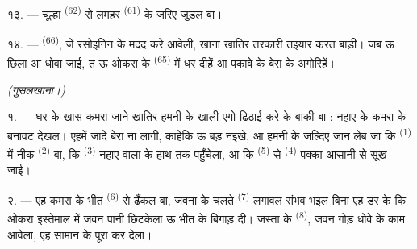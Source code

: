 १३. --- चूल्हा  \textsuperscript{(62)} से लमहर
 \textsuperscript{(61)} के जरिए जुड़ल बा।

१४. ---  \textsuperscript{(66)}, जे रसोइनिन के
मदद करे आवेली, खाना खातिर तरकारी तइयार करत बाड़ी। जब ऊ छिला आ धोवा
जाई, त ऊ ओकरा के  \textsuperscript{(65)} में धर दीहें आ
पकावे के बेरा के अगोरिहें।

\VUsaut{4.0mm}
{\centering\fontsize{10.2pt}{10.2pt}\selectfont{} \textit{(गुसलखाना।)}\par}
\VUsaut{3.0mm}

१. --- घर के खास कमरा जाने खातिर हमनी के खाली एगो ढिठाई करे के बाकी
बा : नहाए के कमरा के बनावट देखल। एहमें जादे बेरा ना लागी, काहेकि ऊ
बड़ नइखे, आ हमनी के जल्दिए जान लेब जा कि 
\textsuperscript{(1)} में नीक 
\textsuperscript{(2)} बा, कि  \textsuperscript{(3)}
नहाए वाला के हाथ तक पहुँचेला, आ कि  \textsuperscript{(5)}
से  \textsuperscript{(4)} पक्का आसानी से सूख जाई।

२. --- एह कमरा के भीत  \textsuperscript{(6)}
से ढँकल बा, जवना के चलते  \textsuperscript{(7)} लगावल संभव
भइल बिना एह डर के कि ओकरा इस्तेमाल में जवन पानी छिटकेला ऊ भीत के बिगाड़
दी। जस्ता के  \textsuperscript{(8)}, जवन गोड़ धोवे के
काम आवेला, एह सामान के पूरा कर देला।
